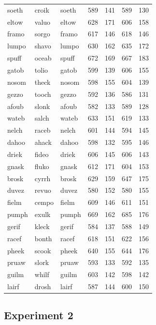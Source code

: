 \documentclass[
]{interact}
\begin{document}
\begin{longtable*}{lllrrrr}
soeth & croik & soeth & 589 & 141 & 589 & 130 \\ 
eltow & valuo & eltow & 628 & 171 & 606 & 158 \\ 
framo & sorgo & framo & 617 & 146 & 618 & 146 \\ 
lumpo & shavo & lumpo & 630 & 162 & 635 & 172 \\ 
spuff & oceab & spuff & 672 & 169 & 667 & 183 \\ 
gatob & tolio & gatob & 599 & 139 & 606 & 155 \\ 
nosom & theck & nosom & 598 & 155 & 604 & 139 \\ 
gezzo & tooch & gezzo & 592 & 136 & 586 & 131 \\ 
afoub & slonk & afoub & 582 & 133 & 589 & 128 \\ 
wateb & salch & wateb & 633 & 151 & 619 & 133 \\ 
nelch & raceb & nelch & 601 & 144 & 594 & 145 \\ 
dahoo & ahack & dahoo & 598 & 132 & 595 & 146 \\ 
driek & fideo & driek & 606 & 145 & 606 & 143 \\ 
gnask & fluko & gnask & 612 & 171 & 604 & 153 \\ 
brosk & cyrrh & brosk & 629 & 159 & 647 & 175 \\ 
duvez & revuo & duvez & 580 & 152 & 580 & 155 \\ 
fielm & cempo & fielm & 609 & 146 & 611 & 151 \\ 
pumph & exulk & pumph & 669 & 162 & 685 & 176 \\ 
gerif & kleck & gerif & 584 & 137 & 588 & 149 \\ 
racef & bonth & racef & 618 & 151 & 622 & 156 \\ 
pheek & scook & pheek & 640 & 155 & 644 & 176 \\ 
pruaw & slork & pruaw & 593 & 133 & 592 & 135 \\ 
guilm & whilf & guilm & 603 & 142 & 598 & 142 \\ 
lairf & drosh & lairf & 587 & 144 & 600 & 150 \\ 
\bottomrule
\end{longtable*}

\subsection*{Experiment 2}\label{experiment-2}
\end{document}

